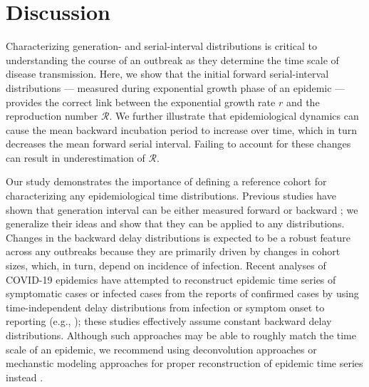 \documentclass[12pt]{article}
\newcommand{\RR}{\ensuremath{{\mathcal R}}\xspace}
\begin{document}
\section{Discussion}

Characterizing generation- and serial-interval distributions is critical to understanding the course of an outbreak as they determine the time scale of disease transmission.
Here, we show that the initial forward serial-interval distributions --- measured during exponential growth phase of an epidemic --- provides the correct link between the exponential growth rate $r$ and the reproduction number \RR.
We further illustrate that epidemiological dynamics can cause the mean backward incubation period to increase over time, which in turn decreases the mean forward serial interval.
Failing to account for these changes can result in underestimation of \RR.

Our study demonstrates the importance of defining a reference cohort for characterizing any epidemiological time distributions.
Previous studies have shown that generation interval can be either measured forward or backward \citep{nishiura2010time,champredon2015intrinsic,britton2019estimation};
we generalize their ideas and show that they can be applied to any distributions.
Changes in the backward delay distributions is expected to be a robust feature across any outbreaks because they are primarily driven by changes in cohort sizes, which, in turn, depend on incidence of infection.
Recent analyses of COVID-19 epidemics have attempted to reconstruct epidemic time series of symptomatic cases or infected cases from the reports of confirmed cases by using time-independent delay distributions from infection or symptom onset to reporting (e.g., \cite{tempvar, park2020potential, shim2020transmission});
these studies effectively assume constant backward delay distributions.
Although such approaches may be able to roughly match the time scale of an epidemic, we recommend using deconvolution approaches \citep{goldstein2009reconstructing} or mechanstic modeling approaches for proper reconstruction of epidemic time series instead \citep{flaxman2020estimating}.
\end{document}
